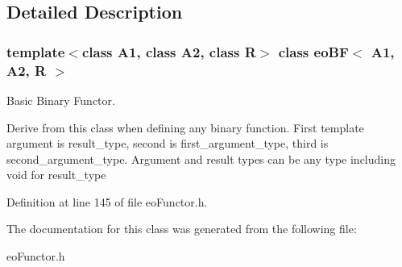 \subsection{Detailed Description}
\subsubsection*{template$<$class A1, class A2, class R$>$ class eo\-BF$<$ A1, A2, R $>$}

Basic Binary Functor. 

Derive from this class when defining any binary function. First template argument is result\_\-type, second is first\_\-argument\_\-type, third is second\_\-argument\_\-type. Argument and result types can be any type including void for result\_\-type 



Definition at line 145 of file eo\-Functor.h.

The documentation for this class was generated from the following file:\begin{CompactItemize}
\item 
eo\-Functor.h\end{CompactItemize}
